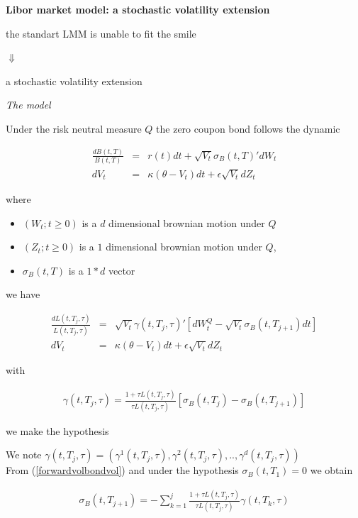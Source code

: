 \documentclass[10pt,a4paper,english,landscape]{slides}
\newcommand{\ban}{\begin{eqnarray*}}
\newcommand{\ean}{\end{eqnarray*}}
\newcommand{\ba}{\begin{eqnarray}}
\newcommand{\ea}{\end{eqnarray}}
\begin{document}
{\bf Libor market model: a stochastic volatility extension}



\begin{center}
the standart LMM is unable to fit the smile 

$\Downarrow$

a stochastic volatility extension 
\end{center}



{\it The model}

Under the risk neutral measure $Q$ the zero coupon bond follows the dynamic

\ban
\frac{dB(t,T)}{B(t,T)}&=&r(t)dt+\sqrt{V_t}\sigma_B(t,T)'dW_t\\
dV_t&=&\kappa(\theta - V_t)dt+\epsilon \sqrt{V_t}dZ_t
\ean

where 

\begin{itemize}
\item $\left( W_t;t\geq 0 \right)$ is a $d$ dimensional brownian motion under $Q$
\item $\left( Z_t;t\geq 0 \right)$ is a $1$ dimensional brownian motion under $Q$, 
\item $\sigma_B(t,T)$ is a $1*d$ vector
\end{itemize}

we have 

\ban
\frac{dL(t,T_j,\tau)}{L(t,T_j,\tau)}&=&\sqrt{V_t}\gamma(t,T_j,\tau)'[dW^Q_t-\sqrt{V_t}\sigma_B(t,T_{j+1})dt] \\
dV_t&=&\kappa(\theta - V_t)dt+\epsilon \sqrt{V_t}dZ_t
\ean

with

\ba
\gamma(t,T_j,\tau)=\frac{1+\tau L(t,T_j,\tau)}{\tau L(t,T_j,\tau)}[\sigma_B(t,T_j)-\sigma_B(t,T_{j+1})] \label{forwardvolbondvol}
\ea


we make the hypothesis  

\begin{center}
\end{center}


We note $\gamma(t,T_j,\tau)=(\gamma^1(t,T_j,\tau),\gamma^2(t,T_j,\tau),..,\gamma^d(t,T_j,\tau) )$ \\

From (\ref{forwardvolbondvol}) and under the hypothesis $\sigma_B(t,T_1)=0$ we obtain

\ban
\sigma_B(t,T_{j+1})=-\sum_{k=1}^j\frac{1+\tau L(t,T_j,\tau)}{\tau L(t,T_j,\tau)}\gamma(t,T_k,\tau) 
\ean
\end{document}
